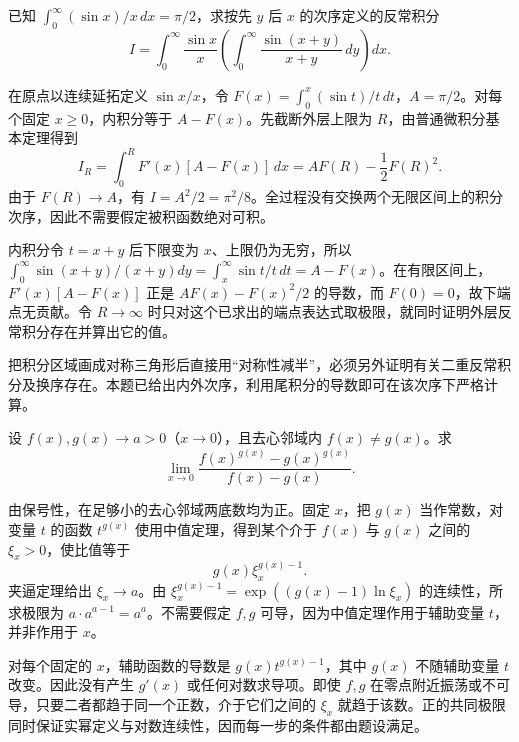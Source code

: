 \documentclass[12pt,fontset=fandol]{ctexart}
\begin{document}
\begin{example}\label{nm-2020-1d}
已知 $\int_0^\infty(\sin x)/x\,dx=\pi/2$，求按先 $y$ 后 $x$ 的次序定义的反常积分
\[
 I=\int_0^\infty\frac{\sin x}{x}
 \left(\int_0^\infty\frac{\sin(x+y)}{x+y}\,dy\right)dx.
\]
\end{example}
\begin{solve}
在原点以连续延拓定义 $\sin x/x$，令 $F(x)=\int_0^x(\sin t)/t\,dt$，$A=\pi/2$。对每个固定 $x\geq0$，内积分等于 $A-F(x)$。先截断外层上限为 $R$，由普通微积分基本定理得到
\[
 I_R=\int_0^R F'(x)[A-F(x)]\,dx
 =AF(R)-\frac12F(R)^2.
\]
由于 $F(R)\to A$，有 $I= A^2/2=\pi^2/8$。全过程没有交换两个无限区间上的积分次序，因此不需要假定被积函数绝对可积。

内积分令 $t=x+y$ 后下限变为 $x$、上限仍为无穷，所以 $\int_0^\infty\sin(x+y)/(x+y)dy=\int_x^\infty\sin t/t\,dt=A-F(x)$。在有限区间上，$F'(x)[A-F(x)]$ 正是 $AF(x)-F(x)^2/2$ 的导数，而 $F(0)=0$，故下端点无贡献。令 $R\to\infty$ 时只对这个已求出的端点表达式取极限，就同时证明外层反常积分存在并算出它的值。

\end{solve}
\begin{remark}
把积分区域画成对称三角形后直接用“对称性减半”，必须另外证明有关二重反常积分及换序存在。本题已给出内外次序，利用尾积分的导数即可在该次序下严格计算。
\end{remark}

\begin{example}\label{nm-2020-1e}
设 $f(x),g(x)\to a>0$（$x\to0$），且去心邻域内 $f(x)\ne g(x)$。求
\[
 \lim_{x\to0}\frac{f(x)^{g(x)}-g(x)^{g(x)}}{f(x)-g(x)}.
\]
\end{example}
\begin{solve}
由保号性，在足够小的去心邻域两底数均为正。固定 $x$，把 $g(x)$ 当作常数，对变量 $t$ 的函数 $t^{g(x)}$ 使用中值定理，得到某个介于 $f(x)$ 与 $g(x)$ 之间的 $\xi_x>0$，使比值等于
\[
 g(x)\xi_x^{g(x)-1}.
\]
夹逼定理给出 $\xi_x\to a$。由 $\xi_x^{g(x)-1}=\exp((g(x)-1)\ln\xi_x)$ 的连续性，所求极限为 $a\cdot a^{a-1}=a^a$。不需要假定 $f,g$ 可导，因为中值定理作用于辅助变量 $t$，并非作用于 $x$。

对每个固定的 $x$，辅助函数的导数是 $g(x)t^{g(x)-1}$，其中 $g(x)$ 不随辅助变量 $t$ 改变。因此没有产生 $g'(x)$ 或任何对数求导项。即使 $f,g$ 在零点附近振荡或不可导，只要二者都趋于同一个正数，介于它们之间的 $\xi_x$ 就趋于该数。正的共同极限同时保证实幂定义与对数连续性，因而每一步的条件都由题设满足。

\end{solve}
\end{document}
